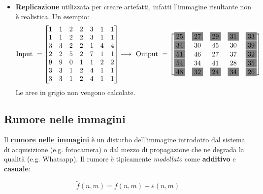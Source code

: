 \documentclass[a4paper]{article}
\begin{document}
\begin{itemize}[label=-]
		\newpage
		
		\item \textbf{Replicazione} utilizzata per creare artefatti, infatti l'immagine risultante non è realistica. Un esempio:
		\begin{equation*}
			\text{Input } = 
			\begin{bmatrix}
				1 & 1 & 2 & 2 & 3 & 1 & 1 \\
				1 & 1 & 2 & 2 & 3 & 1 & 1 \\
				3 & 3 & 2 & 2 & 1 & 4 & 4 \\
				2 & 2 & 5 & 2 & 7 & 1 & 1 \\
				9 & 9 & 0 & 1 & 1 & 2 & 2 \\
				3 & 3 & 1 & 2 & 4 & 1 & 1 \\
				3 & 3 & 1 & 2 & 4 & 1 & 1
			\end{bmatrix}
			\longrightarrow
			\text{ Output } = 
			\begin{bmatrix}
				\colorbox{gray}{25} & \colorbox{gray}{27} & \colorbox{gray}{29} & \colorbox{gray}{31} & \colorbox{gray}{33} \\
				\colorbox{gray}{34} & 30 & 45 & 30 & \colorbox{gray}{39} \\
				\colorbox{gray}{51} & 46 & 27 & 37 & \colorbox{gray}{32} \\
				\colorbox{gray}{54} & 34 & 41 & 28 & \colorbox{gray}{35} \\
				\colorbox{gray}{48} & \colorbox{gray}{32} & \colorbox{gray}{24} & \colorbox{gray}{34} & \colorbox{gray}{26}
			\end{bmatrix}
		\end{equation*}
		Le aree in grigio non vengono calcolate.
	\end{itemize}

	\newpage
	
	\subsection{Rumore nelle immagini}
	
	Il \textcolor{Red3}{\textbf{\underline{rumore nelle immagini}}} è un disturbo dell'immagine introdotto dal sistema di acquisizione (e.g. fotocamera) o dal mezzo di propagazione che ne degrada la qualità (e.g. Whatsapp). Il rumore è tipicamente \emph{modellato} come \textbf{additivo} e \textbf{casuale}:
	
	\begin{equation*}
		\tilde{f}\left(n,m\right) = f\left(n,m\right) + \varepsilon\left(n,m\right)
	\end{equation*}
\end{document}
